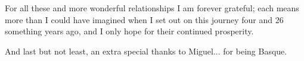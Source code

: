 For all these and more wonderful relationships I am forever grateful; each means more than I could have imagined when I set out on this journey four and 26 something years ago, and I only hope for their continued prosperity.

And last but not least, an extra special thanks to Miguel... for being Basque.



